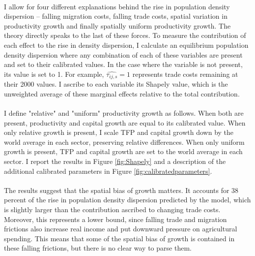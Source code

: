 \documentclass[]{article}
\theoremstyle{plain}
\begin{document}
\paragraph*{}
I allow for four different explanations behind the rise in population density dispersion -- falling migration costs, falling trade costs, spatial variation in productivity growth and finally spatially uniform productivity growth. The theory directly speaks to the last of these forces. To measure the contribution of each effect to the rise in density dispersion, I calculate an equilibrium population density dispersion where any combination of each of these variables are present and set to their calibrated values. In the case where the variable is not present, its value is set to 1. For example, $\hat{\tau_{ij, s}} = 1$ represents trade costs remaining at their 2000 values. I ascribe to each variable its Shapely value, which is the unweighted average of these marginal effects relative to the total contribution.  
\paragraph*{}
 I define "relative" and "uniform" productivity growth as follows. When both are present, productivity and capital growth are equal to its calibrated value. When only relative growth is present, I scale TFP and capital growth down by the world average in each sector, preserving relative differences. When only uniform growth is present, TFP and capital growth are set to the world average in each
 sector. I report the results in Figure \ref{fig:Shapely} and a description of the additional  calibrated parameters in Figure \ref{fig:calibratedparameters}.  

\paragraph*{}
The results suggest that the spatial bias of growth matters. It accounts for 38 percent of the rise in population density dispersion predicted by the model, which is slightly larger than the contribution ascribed to changing trade costs. Moreover, this represents a lower bound, since falling trade and migration frictions also increase real income and put downward pressure on agricultural spending. This means that some of the spatial bias of growth is contained in these falling frictions, but there is no clear way to parse them. 
\end{document}
